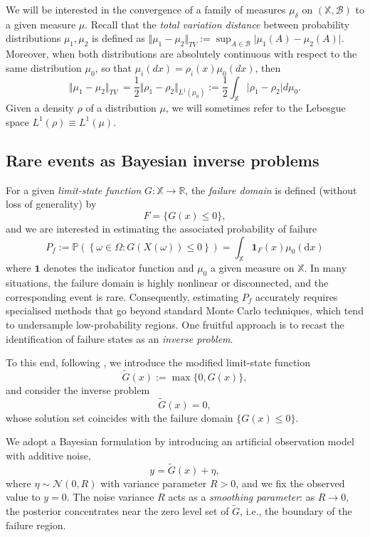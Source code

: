 \documentclass[a4paper]{article}
\numberwithin{equation}{section}
\begin{document}
We will be interested in the convergence of a family of measures $\mu_\delta$ on $(\mathbb X, \mathcal{B})$ to a given measure $\mu$. Recall that the \emph{total variation distance} between probability distributions $\mu_1,\mu_2$ is defined as $\Vert \mu_1-\mu_2\Vert_{TV}:= \sup_{A\in\mathcal{B}} \vert \mu_1(A)-\mu_2(A)\vert$. Moreover, when both distributions are absolutely continuous with respect to the same distribution $\mu_0$, so that $\mu_i(dx)=\rho_i(x)\mu_0(dx)$, then
\[\Vert \mu_1-\mu_2\Vert_{TV}\ = \frac{1}{2}\Vert \rho_1-\rho_2\Vert_{L^1(\mu_0)}:= \frac{1}{2}\int_{\mathbb X} \vert \rho_1-\rho_2\vert d\mu_0. \]
Given a density $\rho$ of a distribution $\mu$, we will sometimes refer to the Lebesgue space $L^1(\rho)\equiv L^1(\mu)$.


\subsection{Rare events as Bayesian inverse problems}

For a given \emph{limit-state function} \( G : \mathbb{X} \rightarrow \mathbb{R} \), the \emph{failure domain} is defined (without loss of generality) by
\[
F=\{ G(x) \le 0 \},
\]
and we are interested in estimating the associated probability of failure
\begin{equation}
    \label{eq:probfailure_event}
    P_f := \mathbb{P}\left( \left\{ \omega \in \Omega : G(X(\omega)) \le 0 \right\} \right)=\int_\mathbb{X} \mathbf{1}_{F}(x) \mu_0(\mathrm dx)
\end{equation}
where $\mathbf 1 $ denotes the indicator function and $\mu_0$ a given measure on $\mathbb X$. 
In many situations, the failure domain is highly nonlinear or disconnected, and the corresponding event is rare. Consequently, estimating \( P_f \) accurately requires specialised methods that go beyond standard Monte Carlo techniques, which tend to undersample low-probability regions. One fruitful approach is to recast the identification of failure states as an \emph{inverse problem}. 

To this end, following \cite{Wagner21}, we introduce the modified limit-state function
\[
\tilde{G}(x) := \max\{ 0, G(x) \},
\]
and consider the inverse problem
\begin{equation}
    \label{eq:inverse}
    \tilde{G}(x) = 0,
\end{equation}
whose solution set coincides with the failure domain $\{G(x)\le 0\}$.

We adopt a Bayesian formulation by introducing an artificial observation model with additive noise,
\begin{equation}
    \label{eq:bayesian_inverseproblem}
    y = \tilde{G}(x) + \eta,
\end{equation}
where \( \eta \sim \mathcal{N}(0, R) \) with variance parameter \( R > 0 \), and we fix the observed value to \( y = 0 \). The noise variance \( R \) acts as a \emph{smoothing parameter}: as \( R \to 0 \), the posterior concentrates near the zero level set of \( \tilde{G} \), i.e., the boundary of the failure region.
\end{document}
